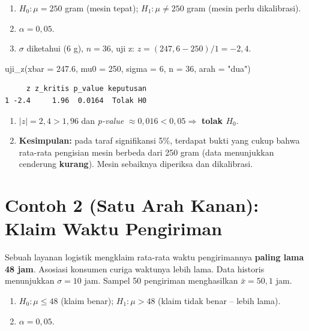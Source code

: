 \documentclass[
  indonesian,
  letterpaper,
]{book}
\newenvironment{Shaded}{\begin{snugshade}}{\end{snugshade}}
\newcommand{\AttributeTok}[1]{\textcolor[rgb]{0.40,0.45,0.13}{#1}}
\newcommand{\DecValTok}[1]{\textcolor[rgb]{0.68,0.00,0.00}{#1}}
\newcommand{\FloatTok}[1]{\textcolor[rgb]{0.68,0.00,0.00}{#1}}
\newcommand{\FunctionTok}[1]{\textcolor[rgb]{0.28,0.35,0.67}{#1}}
\newcommand{\NormalTok}[1]{\textcolor[rgb]{0.00,0.23,0.31}{#1}}
\newcommand{\StringTok}[1]{\textcolor[rgb]{0.13,0.47,0.30}{#1}}
\providecommand{\tightlist}{%
  \setlength{\itemsep}{0pt}\setlength{\parskip}{0pt}}
\begin{document}
\begin{enumerate}
\def\labelenumi{\arabic{enumi}.}
\tightlist
\item
  \(H_0: \mu = 250\) gram (mesin tepat); \(H_1: \mu \neq 250\) gram
  (mesin perlu dikalibrasi).
\item
  \(\alpha = 0{,}05\).
\item
  \(\sigma\) diketahui (6 g), \(n = 36\), uji z:
  \(z = (247{,}6 - 250)/1 = -2{,}4\).
\end{enumerate}

\begin{Shaded}
\begin{Highlighting}[]
\FunctionTok{uji\_z}\NormalTok{(}\AttributeTok{xbar =} \FloatTok{247.6}\NormalTok{, }\AttributeTok{mu0 =} \DecValTok{250}\NormalTok{, }\AttributeTok{sigma =} \DecValTok{6}\NormalTok{, }\AttributeTok{n =} \DecValTok{36}\NormalTok{, }\AttributeTok{arah =} \StringTok{"dua"}\NormalTok{)}
\end{Highlighting}
\end{Shaded}

\begin{verbatim}
     z z_kritis p_value keputusan
1 -2.4     1.96  0.0164  Tolak H0
\end{verbatim}

\begin{enumerate}
\def\labelenumi{\arabic{enumi}.}
\setcounter{enumi}{3}
\tightlist
\item
  \(\lvert z \rvert = 2{,}4 > 1{,}96\) dan \emph{p-value}
  \(\approx 0{,}016 < 0{,}05 \Rightarrow\) \textbf{tolak \(H_0\)}.
\item
  \textbf{Kesimpulan:} pada taraf signifikansi 5\%, terdapat bukti yang
  cukup bahwa rata-rata pengisian mesin berbeda dari 250 gram (data
  menunjukkan cenderung \textbf{kurang}). Mesin sebaiknya diperiksa dan
  dikalibrasi.
\end{enumerate}

\section{Contoh 2 (Satu Arah Kanan): Klaim Waktu
Pengiriman}\label{contoh-2-satu-arah-kanan-klaim-waktu-pengiriman}

Sebuah layanan logistik mengklaim rata-rata waktu pengirimannya
\textbf{paling lama 48 jam}. Asosiasi konsumen curiga waktunya lebih
lama. Data historis menunjukkan \(\sigma = 10\) jam. Sampel 50
pengiriman menghasilkan \(\bar{x} = 50{,}1\) jam.

\begin{enumerate}
\def\labelenumi{\arabic{enumi}.}
\tightlist
\item
  \(H_0: \mu \leq 48\) (klaim benar); \(H_1: \mu > 48\) (klaim tidak
  benar -- lebih lama).
\item
  \(\alpha = 0{,}05\).
\end{enumerate}
\end{document}
